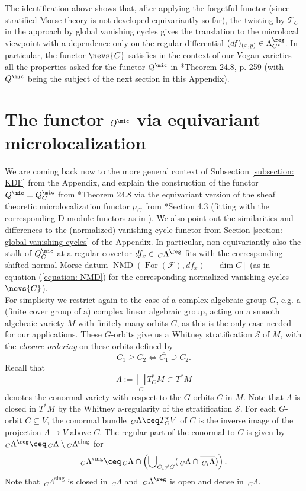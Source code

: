 \documentclass[11pt,letterpaper]{amsart}
\numberwithin{equation}{section}
\begin{document}
The identification above shows that, after applying the forgetful functor (since stratified Morse theory is not developed equivariantly so far),  the twisting by $\mathcal{T}_C$ in the approach by global vanishing cycles gives the translation to the microlocal viewpoint with a dependence only on the regular differential $(df)_{(x,y)}\in \Lambda^\reg_{C^*}$. In particular, the functor
$\nevs{C}$ satisfies in the context of our Vogan varieties all the properties asked for the functor $Q^{\mic}$ in 
\cite{ABV92}*{Theorem 24.8, p. 259} (with $Q^{\mic}$ being the subject of the next section in this Appendix).\\



\section{\texorpdfstring{The functor $Q^\mic$ via equivariant microlocalization}{}}\label{section: Qmic}
We are coming back now to the more general context of
Subsection \ref{subsection: KDF} from the Appendix, and explain the construction of the functor $Q^\mic=Q^\mic_C$
from \cite{ABV92}*{Theorem 24.8} via the equivariant version of the sheaf theoretic 
microlocalization functor $\mu_C$ from \cite{KaS94}*{Section 4.3} (fitting with the corresponding D-module functors as in \cite{MF96}). We also point out the similarities and differences to the (normalized) vanishing cycle functor from Section \ref{section: global vanishing cycles} of the Appendix.
In particular, non-equivariantly also the stalk of 
$Q^\mic_C$ at a regular covector $df_x\in \,_{C}\Lambda^\reg$ fits with the corresponding 
shifted normal Morse datum $\operatorname{NMD}(\operatorname{For}(\mathcal{F}),df_x)[-\dim C]$
(as in equation (\ref{equation: NMD}) for the corresponding  normalized vanishing cycles $\nevs{C}$).\\

For simplicity we restrict again to the case of a complex algebraic group $G$, e.g. a (finite cover group of a) complex linear algebraic group, acting on a smooth algebraic variety $M$ with finitely-many orbits $C$, as this is the only case needed for our applications. These $G$-orbits give us a Whitney stratification $\mathscr{S}$ of $M$, with
 the {\it closure ordering} on these orbits defined by
\[ 
C_1 \geq C_2 \Longleftrightarrow \overline{C_1} \supseteq C_2.
\]
Recall that
$$\Lambda:=  \bigsqcup_{C} T^*_{C} M \subset T^*M$$ 
denotes the conormal variety 
with respect to the  $G$-orbits 
$C$ in $M$. Note that $\Lambda$ is closed in $T^*M$ by the Whitney a-regularity of the stratification $\mathscr{S}$.
For each $G$-orbit $C\subseteq V$, the
conormal bundle  $\,_C\Lambda \ceq T^*_{C}V$ of $C$ is  the inverse image of the projection $\Lambda \to V$ above $C$.
The regular part of the conormal to $C$ is given by
${}_C\Lambda^\reg \ceq \,_C\Lambda \setminus {}_C\Lambda^\textrm{sing}$ for 
\[
{}_C\Lambda^\textrm{sing} \ceq \,_C\Lambda \cap \left( \operatorname{\bigcup}\limits_{C_i\ne C} (\,_{C}\Lambda \cap \overline{\,_{C_i}\Lambda})\right).
\]
Note that  $\,_C\Lambda^\textrm{sing}$ is closed in $\,_C\Lambda$ and $\,_C\Lambda^\reg$ is open and dense in $\,_C\Lambda$.\\
\end{document}
